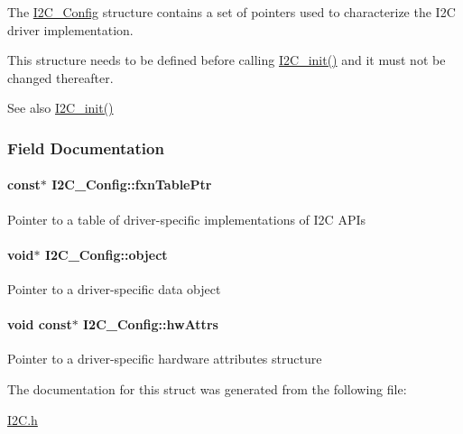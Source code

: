 The \hyperlink{struct_i2_c___config}{I2\+C\+\_\+\+Config} structure contains a set of pointers used to characterize the I2\+C driver implementation.

This structure needs to be defined before calling \hyperlink{_i2_c_8h_a9ff51ddf1d325776fef90cce0223772b}{I2\+C\+\_\+init()} and it must not be changed thereafter.

\begin{DoxySeeAlso}{See also}
\hyperlink{_i2_c_8h_a9ff51ddf1d325776fef90cce0223772b}{I2\+C\+\_\+init()} 
\end{DoxySeeAlso}


\subsubsection{Field Documentation}
\paragraph[{fxn\+Table\+Ptr}]{ const$\ast$ I2\+C\+\_\+\+Config\+::fxn\+Table\+Ptr}\label{struct_i2_c___config_a225800ca2923178397645d520bc6a0c1}
Pointer to a table of driver-\/specific implementations of I2\+C A\+P\+Is 
\paragraph[{object}]{\setlength{\rightskip}{0pt plus 5cm}void$\ast$ I2\+C\+\_\+\+Config\+::object}\label{struct_i2_c___config_abeb7af699744bd43dc1fc5019073fd2c}
Pointer to a driver-\/specific data object 
\paragraph[{hw\+Attrs}]{\setlength{\rightskip}{0pt plus 5cm}void const$\ast$ I2\+C\+\_\+\+Config\+::hw\+Attrs}\label{struct_i2_c___config_a1c623e253c0d5f896ad8037635f0c719}
Pointer to a driver-\/specific hardware attributes structure 

The documentation for this struct was generated from the following file\+:\begin{DoxyCompactItemize}
\item 
\hyperlink{_i2_c_8h}{I2\+C.\+h}\end{DoxyCompactItemize}
